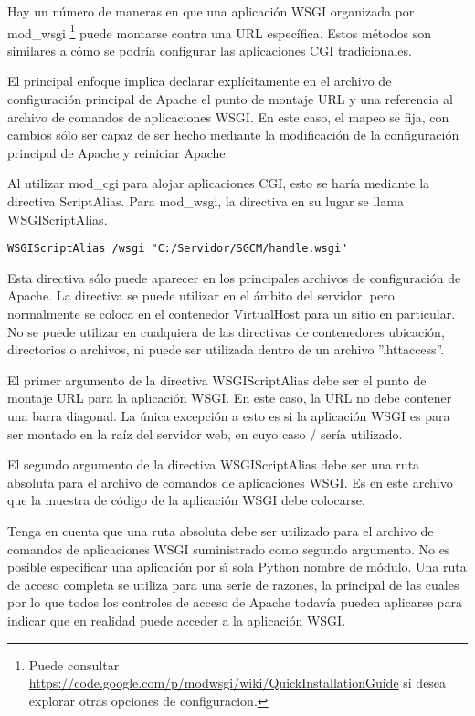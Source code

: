 Hay un número de maneras en que una aplicación WSGI organizada por mod\_wsgi
\footnote{Puede consultar \url{https://code.google.com/p/modwsgi/wiki/QuickInstallationGuide}
si desea explorar otras opciones de configuracion.}
puede montarse contra una URL específica. Estos métodos son similares a cómo se
podría configurar las aplicaciones CGI tradicionales.

El principal enfoque implica declarar explícitamente en el archivo de
configuración principal de Apache el punto de montaje URL y una referencia al
archivo de comandos de aplicaciones WSGI. En este caso, el mapeo se fija,
con cambios sólo ser capaz de ser hecho mediante la modificación de la
configuración principal de Apache y reiniciar Apache.

Al utilizar mod\_cgi para alojar aplicaciones CGI, esto se haría mediante la
directiva ScriptAlias. Para mod\_wsgi, la directiva en su lugar se
llama WSGIScriptAlias.

\begin{lstlisting}[style=consola]
WSGIScriptAlias /wsgi "C:/Servidor/SGCM/handle.wsgi" 
\end{lstlisting}
\vspace{0.1cm}

Esta directiva s\'olo puede aparecer en los principales archivos de configuración
de Apache. La directiva se puede utilizar en el ámbito del servidor, pero
normalmente se coloca en el contenedor VirtualHost para un sitio en particular.
No se puede utilizar en cualquiera de las directivas de contenedores ubicación,
directorios o archivos, ni puede ser utilizada dentro de un archivo ''.httaccess''.

El primer argumento de la directiva WSGIScriptAlias debe ser el punto de montaje
URL para la aplicación WSGI. En este caso, la URL no debe contener una barra
diagonal. La única excepción a esto es si la aplicación WSGI es para ser
montado en la raíz del servidor web, en cuyo caso / sería utilizado.

El segundo argumento de la directiva WSGIScriptAlias debe ser una ruta absoluta
para el archivo de comandos de aplicaciones WSGI. Es en este archivo que la
muestra de código de la aplicación WSGI debe colocarse.

Tenga en cuenta que una ruta absoluta debe ser utilizado para el archivo de
comandos de aplicaciones WSGI suministrado como segundo argumento. No es posible
especificar una aplicaci\'on por s\'{\i}  sola Python nombre de módulo. Una ruta de
acceso completa se utiliza para una serie de razones, la principal de las
cuales por lo que todos los controles de acceso de Apache todavía pueden aplicarse
para indicar que en realidad puede acceder a la aplicación WSGI.


